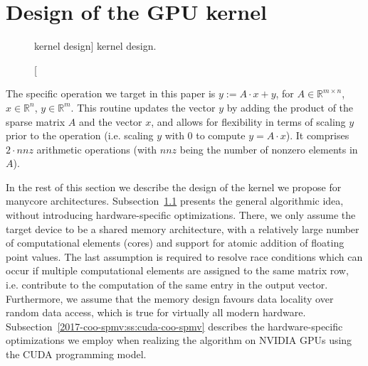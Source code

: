 \section{Design of the \coo \spmv GPU kernel}
\label{2017-coo-spmv:s3-kernel}

\begin{figure}[t]
\begin{minipage}{\columnwidth}

\end{minipage}
\caption
[\coo \spmv kernel design]
{\coo \spmv kernel design.}
\label{2017-coo-spmv:fig:spmv}
\end{figure}

The specific \spmv operation we target in this paper is $y := A\cdot x + y$, 
for $A\in\mathbb{R}^{m\times n}$, $x\in\mathbb{R}^n$, $y\in\mathbb{R}^m$.
This routine updates the vector $y$
by adding the product of the sparse matrix $A$ and the vector $x$,
and allows for flexibility in terms of scaling $y$ prior to the
operation (i.e. scaling $y$ with 0 to compute $y=A\cdot x$).
It comprises $2\cdot nnz$ arithmetic operations (with $nnz$ being the number of nonzero elements in $A$).

In the rest of this section we describe the design of the \coo \spmv kernel we 
propose for manycore architectures.
Subsection~\ref{2017-coo-spmv:ss:coo-spmv} presents the general algorithmic idea, without
introducing hardware-specific optimizations.
There, we only assume the target device to be a shared memory 
architecture, with a relatively large number of
computational elements (cores) and support for atomic addition of floating
point values.
The last assumption is required to resolve race conditions which can occur if 
multiple computational elements are assigned to the same matrix row, i.e. 
contribute 
to the computation of the same entry in the output vector.
Furthermore, we assume that the memory design favours data locality over
random data access, which is true for virtually all modern hardware.
Subsection~\ref{2017-coo-spmv:ss:cuda-coo-spmv} describes the hardware-specific optimizations 
we employ when realizing the \coo \spmv algorithm on NVIDIA GPUs using 
the CUDA programming model.

\subsection{\coo \spmv}
\label{2017-coo-spmv:ss:coo-spmv}

